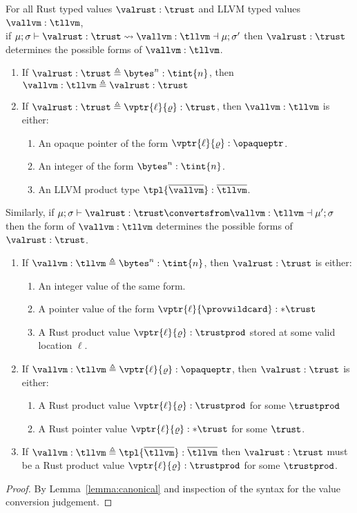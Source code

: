 \begin{lemma}
\label{lemma:compatible}
For all Rust typed values $\valrust:\trust$ and LLVM typed values $\vallvm:\tllvm$,\\ 
if $\mu;\sigma \vdash \valrust:\trust \rightsquigarrow \vallvm:\tllvm \dashv \mu;\sigma'$ then $\valrust:\trust$ determines the possible forms of $\vallvm:\tllvm$.
\begin{enumerate}
\item If $\valrust:\trust \triangleq \bytes^n:\tint{n}$, then $\vallvm:\tllvm \triangleq \valrust:\trust$
\item If $\valrust:\trust \triangleq \vptr{\ell}{\varrho}:\trust$, then $\vallvm:\tllvm$ is either:
\begin{enumerate}
\item An opaque pointer of the form $\vptr{\ell}{\varrho}:\opaqueptr$.
\item An integer of the form $\bytes^n:\tint{n}$.
\item An LLVM product type $\tpl{\overline{\vallvm}}:\overline{\tllvm}$.
\end{enumerate}
\end{enumerate}
Similarly, if $\mu;\sigma \vdash \valrust:\trust \convertsfrom \vallvm:\tllvm \dashv \mu';\sigma$\\
then the form of $\vallvm:\tllvm$ determines the possible forms of $\valrust:\trust$.
\begin{enumerate}
\item If $\vallvm:\tllvm \triangleq \bytes^n:\tint{n}$, then $\valrust:\trust$ is either:
\begin{enumerate}
\item An integer value of the same form.
\item A pointer value of the form $\vptr{\ell}{\provwildcard}:*\trust$
\item A Rust product value $\vptr{\ell}{\varrho} : \trustprod$ stored at some valid location $\ell$.
\end{enumerate}
\item If $\vallvm:\tllvm \triangleq \vptr{\ell}{\varrho}:\opaqueptr$, then $\valrust:\trust$ is either:
\begin{enumerate}
\item A Rust product value $\vptr{\ell}{\varrho}:\trustprod$ for some $\trustprod$
\item A Rust pointer value $\vptr{\ell}{\varrho}:*\trust$ for some $\trust$.
\end{enumerate}
\item If $\vallvm:\tllvm \triangleq \tpl{\overline{\tllvm}}:\overline{\tllvm}$ then $\valrust:\trust$ must be a Rust product value $\vptr{\ell}{\varrho}:\trustprod$ for some $\trustprod$.
\end{enumerate}
\begin{proof}
By Lemma~\ref{lemma:canonical} and inspection of the syntax for the value conversion judgement.
\end{proof}
\end{lemma}

